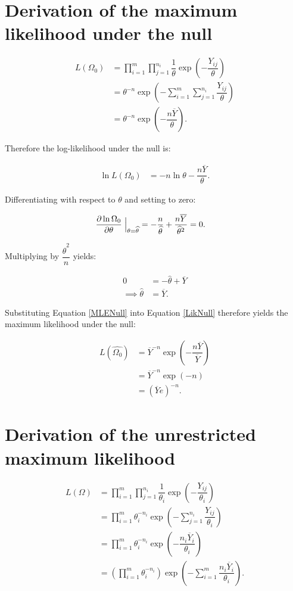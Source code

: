 \documentclass[12pt,a4paper,openright]{article}
\newcommand{\eqn}[1]{Equation \ref{#1}}
\newcommand{\ovY}{\overline{Y}}
\newcommand{\wth}{\widehat{\theta}}
\begin{document}
    \section{Derivation of the maximum likelihood under the null}
    \begin{align}
        L(\Omega_0) &= \prod_{i=1}^m \prod_{j=1}^{n_i} \dfrac{1}{\theta} \exp\left(-\dfrac{Y_{ij}}{\theta}\right) \nonumber\\
        &= \theta^{-n} \exp\left(-\sum_{i=1}^m \sum_{j=1}^{n_i} \dfrac{Y_{ij}}{\theta}\right) \nonumber\\
        &= \theta^{-n} \exp\left(-\dfrac{n\ovY}{\theta}\right). \label{LikNull}
    \end{align}

    Therefore the log-likelihood under the null is:

    \begin{align*}
        \ln{L(\Omega_0)} &= -n\ln{\theta} - \dfrac{n\ovY}{\theta}.
    \end{align*}

    Differentiating with respect to $\theta$ and setting to zero:

    \begin{align*}
        \dfrac{\partial \ln{\Omega_0}}{\partial \theta} \Bigm \lvert_{\theta = \wth} &= -\dfrac{n}{\wth} + \dfrac{n\ovY}{\wth^2} = 0.
    \end{align*}

    Multiplying by $\dfrac{\wth^2}{n}$ yields:

    \begin{align}
        0 &= -\wth + \ovY \nonumber\\
        \implies \wth &= \ovY. \label{MLENull}
    \end{align}

    Substituting \eqn{MLENull} into \eqn{LikNull} therefore yields the maximum likelihood under the null:

    \begin{align}
        L(\widehat{\Omega_0}) &= \ovY^{-n} \exp\left(-\dfrac{n\ovY}{\ovY}\right) \nonumber\\
        &= \ovY^{-n} \exp(-n) \nonumber\\
        &= (\ovY e)^{-n}. \label{MLNull}
    \end{align}

    \section{Derivation of the unrestricted maximum likelihood}
    \begin{align}
        L(\Omega) &= \prod_{i=1}^m \prod_{j=1}^{n_i} \dfrac{1}{\theta_i} \exp\left(-\dfrac{Y_{ij}}{\theta_i}\right) \nonumber \\
        &= \prod_{i=1}^m \theta_i^{-n_i} \exp\left(-\sum_{j=1}^{n_i} \dfrac{Y_{ij}}{\theta_i}\right) \nonumber \\
        &= \prod_{i=1}^m \theta_i^{-n_i} \exp\left(-\dfrac{n_i\ovY_i}{\theta_i}\right) \nonumber \\
        &= \left(\prod_{i=1}^m \theta_i^{-n_i} \right)\exp\left(-\sum_{i=1}^m \dfrac{n_i\ovY_i}{\theta_i}\right).\label{LikUnr}
    \end{align}
\end{document}
